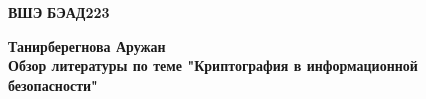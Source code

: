 
\begin{titlepage}
\begin{center}

\textbf{ВШЭ}
\textbf{БЭАД223}

\vspace{35mm}

\textbf{Танирберегнова Аружан} \\[8mm]
\textbf{\large Обзор литературы по теме "Криптография в информационной безопасности"}\\[3mm]






\vfill 

\end{center}
\end{titlepage}

\restoregeometry

\addtocounter{page}{1}
